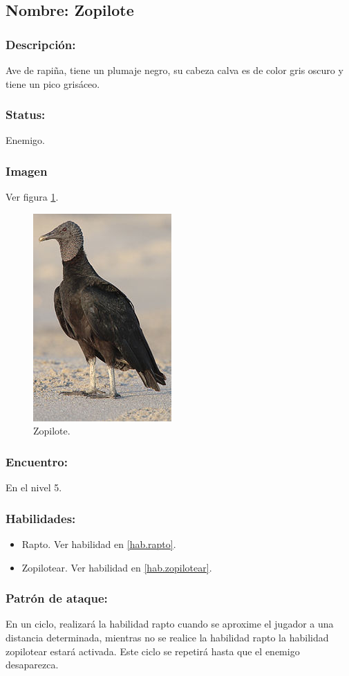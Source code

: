 \documentclass[11pt,letterpaper]{article}
\begin{document}
\subsection{Nombre: Zopilote}   \label{per.zopilote}
\subsubsection{Descripción:}
Ave de rapiña, tiene un plumaje negro, su cabeza calva es de color gris oscuro y tiene un pico grisáceo.
\subsubsection{Status:}
Enemigo.
\subsubsection{Imagen}
Ver figura \ref{fig:zopilote}.
\begin{figure}
	\centering
	\includegraphics[height=0.2 \textheight]{Imagenes/zopilote}
	\caption{Zopilote.}
	\label{fig:zopilote}
\end{figure}
\subsubsection{Encuentro:}
En el nivel 5.
\subsubsection{Habilidades:}
\begin{itemize}
	\item Rapto. Ver habilidad en \ref{hab.rapto}.
	\item Zopilotear. Ver habilidad en \ref{hab.zopilotear}.
\end{itemize}
\subsubsection{Patrón de ataque:}
En un ciclo, realizará la habilidad rapto cuando se aproxime el jugador a una distancia determinada, mientras no se realice la habilidad rapto la habilidad zopilotear estará activada. Este ciclo se repetirá hasta que el enemigo desaparezca.
\end{document}
